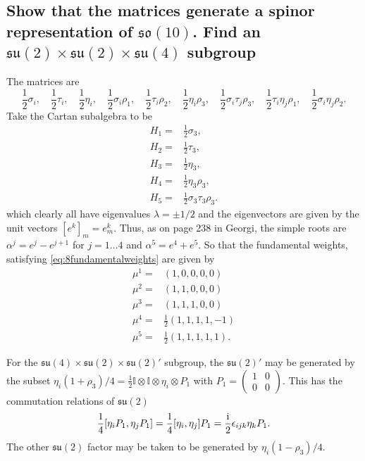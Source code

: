 \documentclass[main.tex]{subfiles}
\begin{document}
\subsection{Show that the matrices generate a spinor representation of $\mathfrak{so}(10)$. Find an $\mathfrak{su}(2)\times\mathfrak{su}(2)\times\mathfrak{su}(4)$ subgroup}
The matrices are
\begin{equation}
\frac{1}{2}\sigma_i,\quad\frac{1}{2}\tau_i,\quad \frac{1}{2}\eta_i,\quad \frac{1}{2}\sigma_i\rho_1,\quad\frac{1}{2}\tau_i\rho_2,\quad\frac{1}{2}\eta_i\rho_3,\quad\frac{1}{2}\sigma_i\tau_j\rho_3,\quad\frac{1}{2}\tau_i\eta_j\rho_1,\quad\frac{1}{2}\sigma_i\eta_j\rho_2.
\end{equation}
Take the Cartan subalgebra to be 
\begin{align}
H_1=&\frac{1}{2}\sigma_3,\\
H_2=&\frac{1}{2}\tau_3,\\
H_3=&\frac{1}{2}\eta_3,\\
H_4=&\frac{1}{2}\eta_3\rho_3,\\
H_5=&\frac{1}{2}\sigma_3\tau_3\rho_3.
\end{align}
which clearly all have eigenvalues $\lambda=\pm1/2$ and the eigenvectors are given by the unit vectors $[e^k]_m=e^k_m$. Thus, as on page 238 in Georgi, the simple roots are $\alpha^j=e^j-e^{j+1}$ for $j=1...4$ and $\alpha^5=e^4+e^{5}$. So that the fundamental weights, satisfying \eqref{eq:8fundamentalweights} are given by 
\begin{align}
\mu^1=&(1,0,0,0,0)\\
\mu^2=&(1,1,0,0,0)\\
\mu^3=&(1,1,1,0,0)\\
\mu^4=&\frac{1}{2}(1,1,1,1,-1)\\
\mu^5=&\frac{1}{2}(1,1,1,1,1).
\end{align}

For the $\mathfrak{su}(4)\times\mathfrak{su}(2)\times\mathfrak{su}(2)'$ subgroup, the $\mathfrak{su}(2)'$ may be generated by the subset $\eta_i(1+\rho_3)/4=\frac{1}{2}\mathbb{I}\otimes\mathbb{I}\otimes\eta_i\otimes P_1$ with $P_1=\begin{pmatrix}1&0\\0&0\end{pmatrix}$. This has the commutation relations of $\mathfrak{su}(2)$
\begin{equation}
\frac{1}{4}[\eta_iP_1,\eta_jP_1]=\frac{1}{4}[\eta_i,\eta_j]P_1=\frac{\mathrm{i}}{2}\epsilon_{ijk}\eta_kP_1.
\end{equation}
The other $\mathfrak{su}(2)$ factor may be taken to be generated by $\eta_i(1-\rho_3)/4$.
\end{document}
